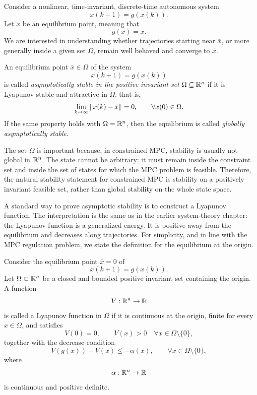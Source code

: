 Consider a nonlinear, time-invariant, discrete-time autonomous system
\[
    x(k+1)=g(x(k)).
\]
Let \(\bar{x}\) be an equilibrium point, meaning that
\[
    g(\bar{x})=\bar{x}.
\]
We are interested in understanding whether trajectories starting near \(\bar{x}\), or more
generally inside a given set \(\Omega\), remain well behaved and converge to \(\bar{x}\).

\begin{theorembox}
An equilibrium point \(\bar{x}\in\Omega\) of the system
\[
    x(k+1)=g(x(k))
\]
is called \emph{asymptotically stable in the positive invariant set}
\(\Omega\subseteq\mathbb{R}^n\) if it is Lyapunov stable and attractive in \(\Omega\), that is,
\[
    \lim_{k\to\infty}\left\lVert x(k)-\bar{x} \right\rVert=0,
    \qquad
    \forall x(0)\in\Omega.
\]
If the same property holds with \(\Omega=\mathbb{R}^n\), then the equilibrium is called
\emph{globally asymptotically stable}.
\end{theorembox}

The set \(\Omega\) is important because, in constrained MPC, stability is usually not global in
\(\mathbb{R}^n\). The state cannot be arbitrary: it must remain inside the constraint set and inside the
set of states for which the MPC problem is feasible. Therefore, the natural stability statement
for constrained MPC is stability on a positively invariant feasible set, rather than global
stability on the whole state space.

A standard way to prove asymptotic stability is to construct a Lyapunov function. The
interpretation is the same as in the earlier system-theory chapter: the Lyapunov function is a
generalized energy. It is positive away from the equilibrium and decreases along trajectories.
For simplicity, and in line with the MPC regulation problem, we state the definition for the
equilibrium at the origin.

\begin{theorembox}
Consider the equilibrium point \(\bar{x}=0\) of
\[
    x(k+1)=g(x(k)).
\]
Let \(\Omega\subset\mathbb{R}^n\) be a closed and bounded positive invariant set containing the origin.
A function
\[
    V:\mathbb{R}^n\to\mathbb{R}
\]
is called a Lyapunov function in \(\Omega\) if it is continuous at the origin, finite for every
\(x\in\Omega\), and satisfies
\[
    V(0)=0,
    \qquad
    V(x)>0
    \quad
    \forall x\in\Omega\setminus\{0\},
\]
together with the decrease condition
\[
    V(g(x))-V(x)\leq -\alpha(x),
    \qquad
    \forall x\in\Omega\setminus\{0\},
\]
where
\[
    \alpha:\mathbb{R}^n\to\mathbb{R}
\]
is continuous and positive definite.
\end{theorembox}

